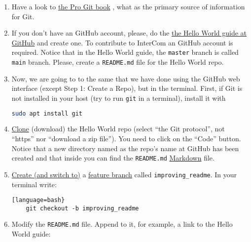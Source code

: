 \begin{enumerate}
  
\item Have a look to \href{https://git-scm.com/book/en/v2}{the Pro Git
  book} \cite{Git-book}, what as the primary source of information for
  Git.

\item If you don't have an GitHub account, please, do the
  \href{https://guides.github.com/activities/hello-world/}{the Hello
    World guide at GitHub} and create one. To contribute to InterCom
  an GitHub account is required. Notice that in the Hello World guide,
  the \texttt{master} branch is called \texttt{main} branch. Please,
  create a \texttt{README.md} file for the Hello World repo.

\item Now, we are going to to the same that we have done using the
  GitHub web interface (except Step 1: Create a Repo), but in the
  terminal. First, if Git is not installed in your host (try to run
  \texttt{git} in a terminal), install it with
  \begin{lstlisting}[language=bash]
    sudo apt install git
  \end{lstlisting}

\item
  \href{https://docs.github.com/en/github/getting-started-with-github/github-glossary#clone}{Clone}
  (download) the Hello World repo (select ``the Git protocol'', not
  ``https'' nor ``download a zip file''). You need to click on the
  ``Code'' button. Notice that a new directory named as the repo's
  name at GitHub has been created and that inside you can find the
  \texttt{README.md}
  \href{https://daringfireball.net/projects/markdown/}{Markdown} file.

\item \href{https://docs.github.com/en/github/getting-started-with-github/github-glossary#checkout}{Create (and switch to)} a
  \href{https://docs.github.com/en/github/getting-started-with-github/github-glossary#feature-branch}{feature
    branch} called \texttt{improving_readme}. In your terminal write:
  
  \begin{lstlisting}[language=bash}
    git checkout -b improving_readme
  \end{lstlisting}
  
\item Modify the \texttt{README.md} file. Append to it, for example, a
  link to the Hello World guide:
  

\end{enumerate}
